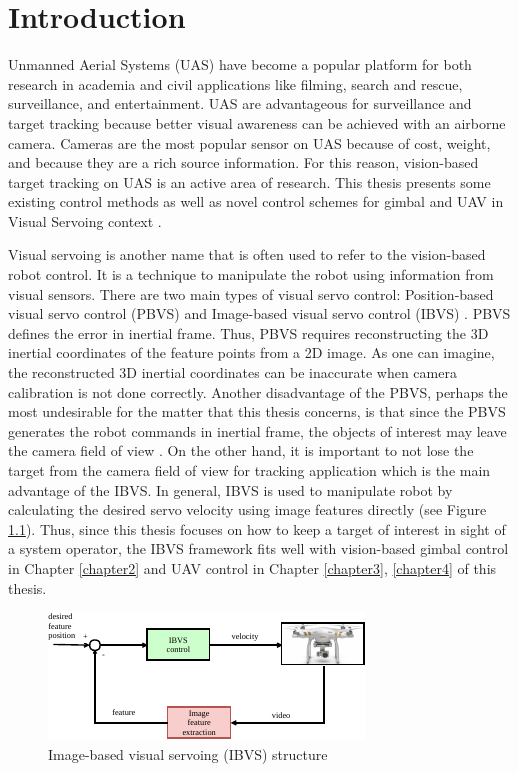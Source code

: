 \chapter{Introduction}

Unmanned Aerial Systems (UAS) have become a popular platform for both research in academia and civil applications like filming, search and rescue, surveillance, and entertainment. UAS are advantageous for surveillance and target tracking because better visual awareness can be achieved with an airborne camera. Cameras are the most popular sensor on UAS because of cost, weight, and because they are a rich source information. For this reason, vision-based target tracking on UAS is an active area of research. This thesis presents some existing control methods as well as novel control schemes for gimbal and UAV in Visual Servoing context \cite{Hutchinson1996}. 

Visual servoing is another name that is often used to refer to the vision-based robot control. It is a technique to manipulate the robot using information from visual sensors. There are two main types of visual servo control: Position-based visual servo control (PBVS) and Image-based visual servo control (IBVS) \cite{Chaumette2006}. PBVS defines the error in inertial frame. Thus, PBVS requires reconstructing the 3D inertial coordinates of the feature points from a 2D image. As one can imagine, the reconstructed 3D inertial coordinates can be inaccurate when camera calibration is not done correctly. Another disadvantage of the PBVS, perhaps the most undesirable for the matter that this thesis concerns, is that since the PBVS generates the robot commands in inertial frame, the objects of interest may leave the camera field of view \cite{Hu2009}. On the other hand, it is important to not lose the target from the camera field of view for tracking application which is the main advantage of the IBVS. In general, IBVS is used to manipulate robot by calculating the desired servo velocity using image features directly (see Figure \ref{ibvs}). Thus, since this thesis focuses on how to keep a target of interest in sight of a system operator, the IBVS framework fits well with vision-based gimbal control in Chapter \ref{chapter2} and UAV control in Chapter \ref{chapter3}, \ref{chapter4} of this thesis. 

\begin{figure}[htbp]
	\centering
	\includegraphics[width = 0.5\textheight]{images/ibvs}
	\caption{Image-based visual servoing (IBVS) structure}
	\label{ibvs}
\end{figure}

